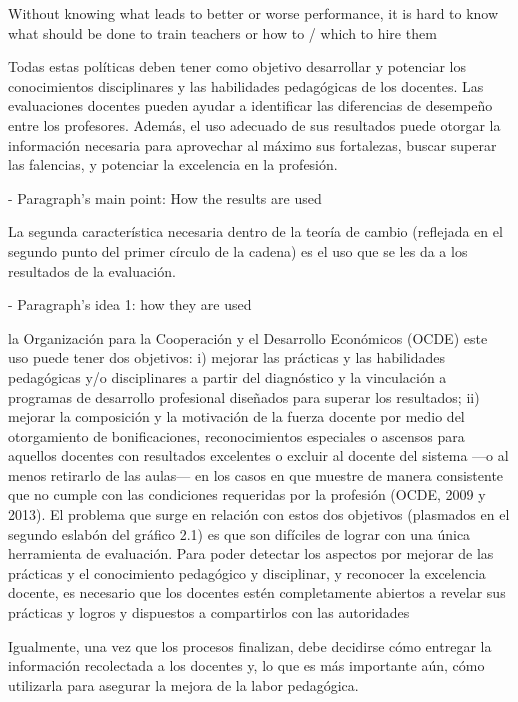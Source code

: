Without knowing what leads to better or worse performance, it is hard to know what should be done to train teachers or how to / which to hire them \citep{Hanushek_et_al_2012}







Todas estas políticas deben tener como objetivo desarrollar y potenciar los conocimientos disciplinares y las habilidades pedagógicas de los docentes. Las evaluaciones docentes pueden ayudar a identificar las diferencias de desempeño entre los profesores. Además, el uso adecuado de sus resultados puede otorgar la información necesaria para aprovechar al máximo sus fortalezas, buscar superar las falencias, y potenciar la excelencia en la profesión. \citep{Hincapie_et_al_2020}




- Paragraph's main point: How the results are used

La segunda característica necesaria dentro de la teoría de cambio (reflejada en el segundo punto del primer círculo de la cadena) es el uso que se les da a los resultados de la evaluación. \citep{Hincapie_et_al_2020}


- Paragraph's idea 1: how they are used

la Organización para la Cooperación y el Desarrollo Económicos (OCDE) este uso puede tener dos objetivos: i) mejorar las prácticas y las habilidades pedagógicas y/o disciplinares a partir del diagnóstico y la vinculación a programas de desarrollo profesional diseñados para superar los resultados; ii) mejorar la composición y la motivación de la fuerza docente por medio del otorgamiento de bonificaciones, reconocimientos especiales o ascensos para aquellos docentes con resultados excelentes o excluir al docente del sistema —o al menos retirarlo de las aulas— en los casos en que muestre de manera consistente que no cumple con las condiciones requeridas por la profesión (OCDE, 2009 y 2013).
El problema que surge en relación con estos dos objetivos (plasmados en el segundo eslabón del gráfico 2.1) es que son difíciles de lograr con una única herramienta de evaluación.
Para poder detectar los aspectos por mejorar de las prácticas y el conocimiento pedagógico y disciplinar, y reconocer la excelencia docente, es necesario que los docentes estén completamente abiertos a revelar sus prácticas y logros y dispuestos a compartirlos con las autoridades \citep{Hincapie_et_al_2020}

Igualmente, una vez que los procesos finalizan, debe decidirse cómo entregar la información recolectada a los docentes y, lo que es más importante aún, cómo utilizarla para asegurar la mejora de la labor pedagógica. \citep{Hincapie_et_al_2020}



